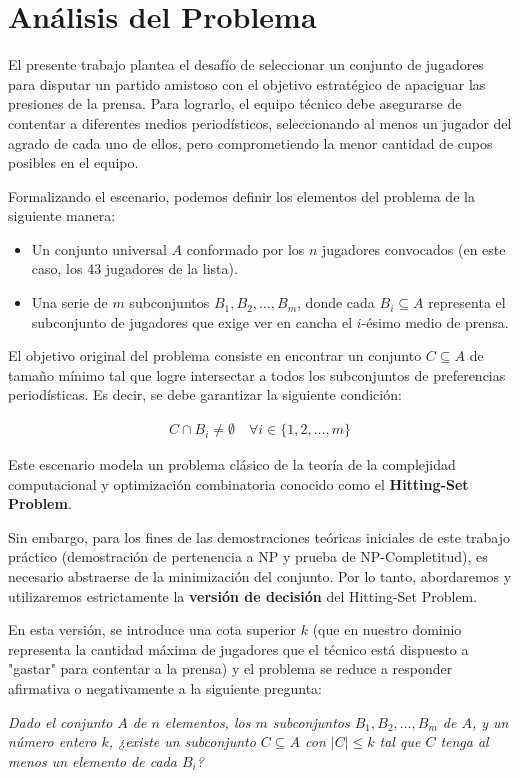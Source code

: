 \section{Análisis del Problema}

El presente trabajo plantea el desafío de seleccionar un conjunto de jugadores para disputar un partido amistoso con el objetivo estratégico de apaciguar las presiones de la prensa. Para lograrlo, el equipo técnico debe asegurarse de contentar a diferentes medios periodísticos, seleccionando al menos un jugador del agrado de cada uno de ellos, pero comprometiendo la menor cantidad de cupos posibles en el equipo.

Formalizando el escenario, podemos definir los elementos del problema de la siguiente manera:
\begin{itemize}
    \item Un conjunto universal $A$ conformado por los $n$ jugadores convocados (en este caso, los 43 jugadores de la lista).
    \item Una serie de $m$ subconjuntos $B_1, B_2, \dots, B_m$, donde cada $B_i \subseteq A$ representa el subconjunto de jugadores que exige ver en cancha el $i$-ésimo medio de prensa.
\end{itemize}

El objetivo original del problema consiste en encontrar un conjunto $C \subseteq A$ de tamaño mínimo tal que logre intersectar a todos los subconjuntos de preferencias periodísticas. Es decir, se debe garantizar la siguiente condición:

\begin{eqnarray}
C \cap B_i \neq \emptyset \quad \forall i \in \{1, 2, \dots, m\}
\label{hitting-set-condition}
\end{eqnarray}

Este escenario modela un problema clásico de la teoría de la complejidad computacional y optimización combinatoria conocido como el \textbf{Hitting-Set Problem}.

Sin embargo, para los fines de las demostraciones teóricas iniciales de este trabajo práctico (demostración de pertenencia a NP y prueba de NP-Completitud), es necesario abstraerse de la minimización del conjunto. Por lo tanto, abordaremos y utilizaremos estrictamente la \textbf{versión de decisión} del Hitting-Set Problem. 

En esta versión, se introduce una cota superior $k$ (que en nuestro dominio representa la cantidad máxima de jugadores que el técnico está dispuesto a "gastar" para contentar a la prensa) y el problema se reduce a responder afirmativa o negativamente a la siguiente pregunta:

\textit{Dado el conjunto $A$ de $n$ elementos, los $m$ subconjuntos $B_1, B_2, \dots, B_m$ de $A$, y un número entero $k$, ¿existe un subconjunto $C \subseteq A$ con $|C| \leq k$ tal que $C$ tenga al menos un elemento de cada $B_i$?}

\newpage
